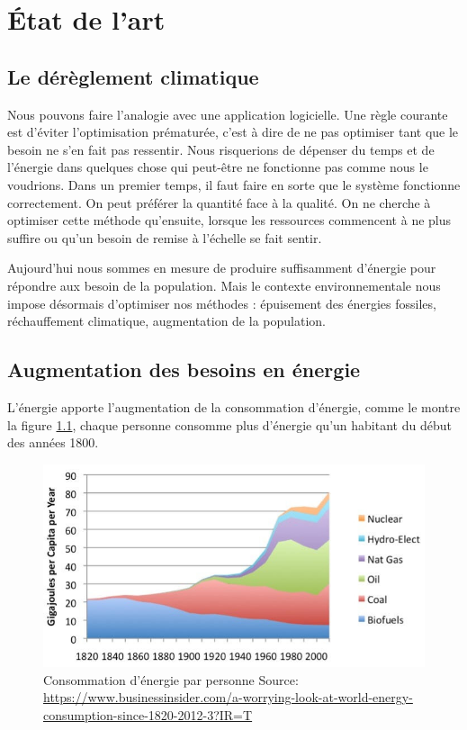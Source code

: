 \chapter{État de l’art}

\section{Le dérèglement climatique}

Nous pouvons faire l’analogie avec une application logicielle. Une règle courante est d’éviter
l’optimisation prématurée, c’est à dire de ne pas optimiser tant que le besoin ne s’en fait pas
ressentir. Nous risquerions de dépenser du temps et de l'énergie dans quelques chose qui
peut-être ne fonctionne pas comme nous le voudrions.
Dans un premier temps, il faut faire en sorte que le système fonctionne correctement.
On peut préférer la quantité face à la qualité. On ne cherche à optimiser cette méthode
qu’ensuite, lorsque les ressources commencent à ne plus suffire ou qu’un besoin de remise
à l’échelle se fait sentir.

Aujourd'hui nous sommes en mesure de produire suffisamment d’énergie pour répondre aux
besoin de la population. Mais le contexte environnementale nous impose désormais d’optimiser
nos méthodes : épuisement des énergies fossiles, réchauffement climatique, augmentation de la
population.

\section{Augmentation des besoins en énergie}

L'énergie apporte l'augmentation de la consommation d'énergie, comme le montre la figure
\ref{fig:capita_energy}, chaque personne consomme plus d'énergie qu'un habitant
du début des années 1800.

\begin{figure}
  \centering
  \includegraphics[scale=0.35]{media/world_per_capita_energy.jpeg}
  \caption{
      Consommation d'énergie par personne\newline
      \tiny{Source:\newline
        \url{https://www.businessinsider.com/a-worrying-look-at-world-energy-consumption-since-1820-2012-3?IR=T}
      }
  }
  \label{fig:capita_energy}
\end{figure}

